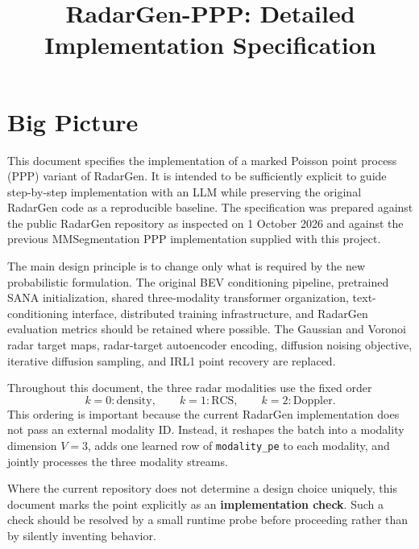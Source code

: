 \documentclass[11pt,a4paper]{article}
\title{RadarGen-PPP: Detailed Implementation Specification}
\author{}
\date{}
\begin{document}
\maketitle

\section{Big Picture}

\noindent
This document specifies the implementation of a marked Poisson point process (PPP) variant of RadarGen. It is intended to be sufficiently explicit to guide step-by-step implementation with an LLM while preserving the original RadarGen code as a reproducible baseline. The specification was prepared against the public RadarGen repository as inspected on 1 October 2026 and against the previous MMSegmentation PPP implementation supplied with this project.

\medskip

\noindent
The main design principle is to change only what is required by the new probabilistic formulation. The original BEV conditioning pipeline, pretrained SANA initialization, shared three-modality transformer organization, text-conditioning interface, distributed training infrastructure, and RadarGen evaluation metrics should be retained where possible. The Gaussian and Voronoi radar target maps, radar-target autoencoder encoding, diffusion noising objective, iterative diffusion sampling, and IRL1 point recovery are replaced.

\medskip

\noindent
Throughout this document, the three radar modalities use the fixed order
\[
    k=0:\mathrm{density},\qquad
    k=1:\mathrm{RCS},\qquad
    k=2:\mathrm{Doppler}.
\]
This ordering is important because the current RadarGen implementation does not pass an external modality ID. Instead, it reshapes the batch into a modality dimension \(V=3\), adds one learned row of \texttt{modality\_pe} to each modality, and jointly processes the three modality streams.

\medskip

\noindent
Where the current repository does not determine a design choice uniquely, this document marks the point explicitly as an \textbf{implementation check}. Such a check should be resolved by a small runtime probe before proceeding rather than by silently inventing behavior.
\end{document}
